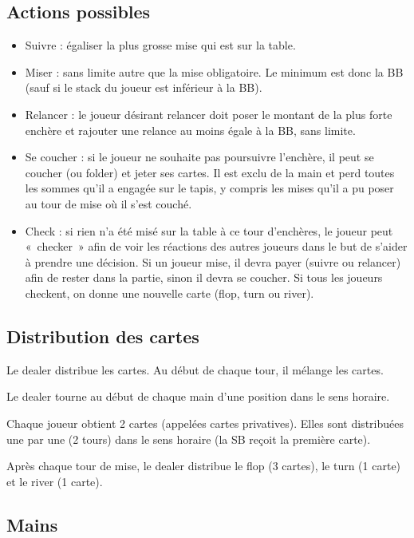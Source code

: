 \documentclass[a4paper]{article}
\begin{document}
\subsection{Actions possibles}

\begin{itemize}
	\item Suivre : égaliser la plus grosse mise qui est sur la table.
	\item Miser : sans limite autre que la mise obligatoire. Le minimum est donc la BB (sauf si le stack du joueur est inférieur à la BB).
	\item Relancer : le joueur désirant relancer doit poser le montant de la plus forte enchère et rajouter une relance au moins égale à la BB, sans limite.
	\item Se coucher : si le joueur ne souhaite pas poursuivre l'enchère, il peut se coucher (ou folder) et jeter ses cartes. Il est exclu de la main et perd toutes les sommes qu'il a engagée sur le tapis, y compris les mises qu'il a pu poser au tour de mise où il s'est couché.
	\item Check : si rien n'a été misé sur la table à ce tour d'enchères, le joueur peut «~checker~» afin de voir les réactions des autres joueurs dans le but de s'aider à prendre une décision. Si un joueur mise, il devra payer (suivre ou relancer) afin de rester dans la partie, sinon il devra se coucher. Si tous les joueurs checkent, on donne une nouvelle carte (flop, turn ou river).
\end{itemize}

\subsection{Distribution des cartes}

Le dealer distribue les cartes.
Au début de chaque tour, il mélange les cartes.

Le dealer tourne au début de chaque main d'une position dans le sens horaire.

Chaque joueur obtient 2 cartes (appelées cartes privatives). Elles sont distribuées une par une (2 tours) dans le sens horaire (la SB reçoit la première carte).

Après chaque tour de mise, le dealer distribue le flop (3 cartes), le turn (1 carte) et le river (1 carte).

\subsection{Mains}
\end{document}
